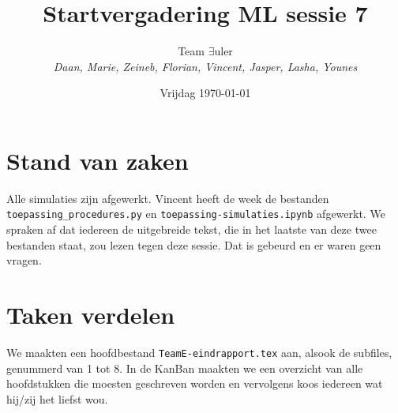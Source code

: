 \documentclass{article}
\title{Startvergadering ML sessie 7}
\author{Team $\exists$uler\\
	\textit{Daan, Marie, Zeineb, Florian, Vincent, Jasper, Lasha, Younes}}
\date{Vrijdag \today}
\begin{document}
	
	\maketitle
	
	\section*{Stand van zaken}
	
	Alle simulaties zijn afgewerkt. Vincent heeft de week de bestanden \texttt{toepassing\_procedures.py} en \texttt{toepassing-simulaties.ipynb} afgewerkt. We spraken af dat iedereen de uitgebreide tekst, die in het laatste van deze twee bestanden staat, zou lezen tegen deze sessie. Dat is gebeurd en er waren geen vragen.
	
	\section*{Taken verdelen}
	
	We maakten een hoofdbestand \texttt{TeamE-eindrapport.tex} aan, alsook de subfiles, genummerd van 1 tot 8. In de KanBan maakten we een overzicht van alle hoofdstukken die moesten geschreven worden en vervolgens koos iedereen wat hij/zij het liefst wou.
\end{document}
